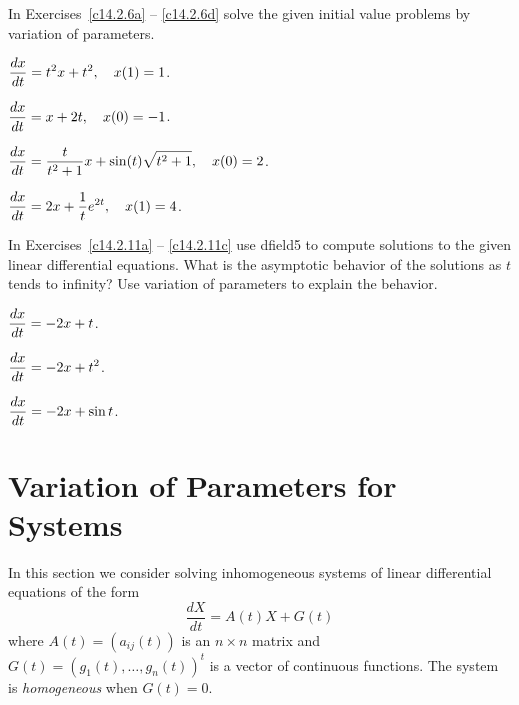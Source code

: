 \documentclass{ximera}
\begin{document}
\noindent In Exercises~\ref{c14.2.6a} -- \ref{c14.2.6d} solve the given 
initial value problems by variation of parameters.
\begin{exercise}   \label{c14.2.6a}
$\displaystyle \frac{dx}{dt} = t^2 x + t^2, \quad x(1)=1$.
\end{exercise}
\begin{exercise}   \label{c14.2.6b}
$\displaystyle \frac{dx}{dt} = x+2t, \quad x(0)=-1$.
\end{exercise}
\begin{exercise}   \label{c14.2.6c}
$\displaystyle \frac{dx}{dt} = 
\frac{t}{t^2+1}x+\sin(t)\sqrt{t^2+1},\quad x(0)=2$.
\end{exercise}
\begin{exercise}   \label{c14.2.6d}
$\displaystyle \frac{dx}{dt} = 2x+\frac{1}{t}e^{2t}, \quad x(1)=4$.
\end{exercise}



\CEXER

\noindent In Exercises~\ref{c14.2.11a} -- \ref{c14.2.11c} use 
{\sf dfield5} 
to compute solutions to the given linear differential equations.  What is 
the asymptotic behavior of the solutions as $t$ tends to infinity?  Use 
variation of parameters to explain the behavior.
\begin{exercise}   \label{c14.2.11a}
$\displaystyle\frac{dx}{dt} = -2 x + t$.
\end{exercise}
\begin{exercise}   \label{c14.2.11b}
$\displaystyle\frac{dx}{dt} = -2 x + t^2$.
\end{exercise}
\begin{exercise}   \label{c14.2.11c}
$\displaystyle\frac{dx}{dt} = -2 x + \sin t$.
\end{exercise}




\section{Variation of Parameters for Systems}
\label{sec:LinInhomSys}

In this section we consider solving inhomogeneous systems of linear
differential equations  of the form
\arraystart
\begin{equation}  \label{eq:linihsys}
\frac{dX}{dt}  =  A(t)X + G(t) 
\end{equation}
\arrayfinish
where $A(t)=(a_{ij}(t))$ is an $n\times n$ matrix and
$G(t)=(g_1(t),\ldots,g_n(t))^t$ is a vector of continuous functions.  
The system is {\em homogeneous\/} when $G(t)=0$.
\end{document}
